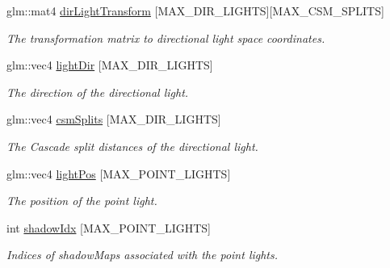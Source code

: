 \begin{DoxyCompactItemize}
\item 
\mbox{\label{structblaze_1_1LightsUniformBufferObject_ad018f401f59306238a25b5011083bb5c}} 
glm\+::mat4 \hyperlink{structblaze_1_1LightsUniformBufferObject_ad018f401f59306238a25b5011083bb5c}{dir\+Light\+Transform} \mbox{[}M\+A\+X\+\_\+\+D\+I\+R\+\_\+\+L\+I\+G\+H\+TS\mbox{]}\mbox{[}M\+A\+X\+\_\+\+C\+S\+M\+\_\+\+S\+P\+L\+I\+TS\mbox{]}
\begin{DoxyCompactList}\small\item\em The transformation matrix to directional light space coordinates. \end{DoxyCompactList}\item 
glm\+::vec4 \hyperlink{structblaze_1_1LightsUniformBufferObject_a2ebec5884a12f8554de270b8c71ee7d9}{light\+Dir} \mbox{[}M\+A\+X\+\_\+\+D\+I\+R\+\_\+\+L\+I\+G\+H\+TS\mbox{]}
\begin{DoxyCompactList}\small\item\em The direction of the directional light. \end{DoxyCompactList}\item 
glm\+::vec4 \hyperlink{structblaze_1_1LightsUniformBufferObject_a7ec8d8fa3003f1e03e8486064aff2243}{csm\+Splits} \mbox{[}M\+A\+X\+\_\+\+D\+I\+R\+\_\+\+L\+I\+G\+H\+TS\mbox{]}
\begin{DoxyCompactList}\small\item\em The Cascade split distances of the directional light. \end{DoxyCompactList}\item 
glm\+::vec4 \hyperlink{structblaze_1_1LightsUniformBufferObject_af1ad7c6e501ff86a3e1e537231a34c26}{light\+Pos} \mbox{[}M\+A\+X\+\_\+\+P\+O\+I\+N\+T\+\_\+\+L\+I\+G\+H\+TS\mbox{]}
\begin{DoxyCompactList}\small\item\em The position of the point light. \end{DoxyCompactList}\item 
int \hyperlink{structblaze_1_1LightsUniformBufferObject_a3530c4ca1d0e496e88bfb63b880776bb}{shadow\+Idx} \mbox{[}M\+A\+X\+\_\+\+P\+O\+I\+N\+T\+\_\+\+L\+I\+G\+H\+TS\mbox{]}
\begin{DoxyCompactList}\small\item\em Indices of shadow\+Maps associated with the point lights. \end{DoxyCompactList}\item 

\end{DoxyCompactItemize}
